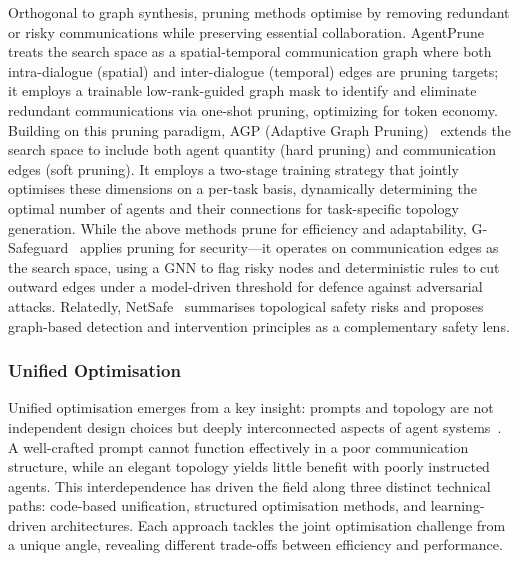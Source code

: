 \documentclass[]{selfevolagent}
\theoremstyle{plain}
\theoremstyle{definition}
\theoremstyle{remark}
\begin{document}
Orthogonal to graph synthesis, pruning methods optimise by removing redundant or risky communications while preserving essential collaboration.
AgentPrune~\citep{zhang2025cut} treats the search space as a spatial-temporal communication graph where both intra-dialogue (spatial) and inter-dialogue (temporal) edges are pruning targets; it employs a trainable low-rank-guided graph mask to identify and eliminate redundant communications via one-shot pruning, optimizing for token economy.
Building on this pruning paradigm, AGP (Adaptive Graph Pruning)~\citep{li2025adaptivegraphpruningmultiagent} extends the search space to include both agent quantity (hard pruning) and communication edges (soft pruning). It employs a two-stage training strategy that jointly optimises these dimensions on a per-task basis, dynamically determining the optimal number of agents and their connections for task-specific topology generation.
While the above methods prune for efficiency and adaptability, G-Safeguard~\citep{wang2025gsafeguardtopologyguidedsecuritylens} applies pruning for security—it operates on communication edges as the search space, using a GNN to flag risky nodes and deterministic rules to cut outward edges under a model-driven threshold for defence against adversarial attacks. Relatedly, NetSafe~\citep{yu2024netsafeexploringtopologicalsafety} summarises topological safety risks and proposes graph-based detection and intervention principles as a complementary safety lens.


\subsubsection{Unified Optimisation}
Unified optimisation emerges from a key insight: prompts and topology are not independent design choices but deeply interconnected aspects of agent systems~\citep{zhou2025multi}. A well-crafted prompt cannot function effectively in a poor communication structure, while an elegant topology yields little benefit with poorly instructed agents. This interdependence has driven the field along three distinct technical paths: code-based unification, structured optimisation methods, and learning-driven architectures. Each approach tackles the joint optimisation challenge from a unique angle, revealing different trade-offs between efficiency and performance.
\end{document}
